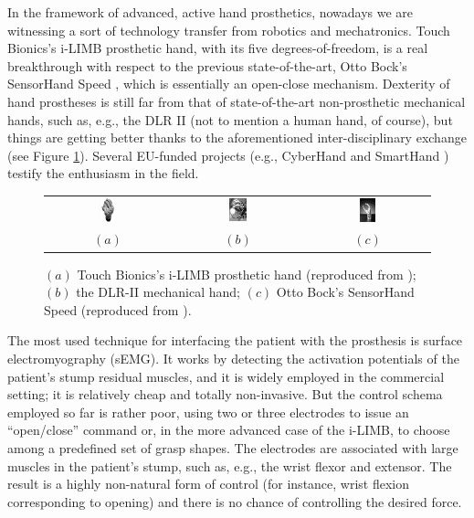 In the framework of advanced, active hand prosthetics, nowadays we are
witnessing a sort of technology transfer from robotics and
mechatronics. Touch Bionics's i-LIMB \cite{ilimb} prosthetic hand,
with its five degrees-of-freedom, is a real breakthrough with respect
to the previous state-of-the-art, Otto Bock's SensorHand Speed
\cite{sensorhand}, which is essentially an open-close
mechanism. Dexterity of hand prostheses is still far from that of
state-of-the-art non-prosthetic mechanical hands, such as, e.g., the
DLR II \cite{Hua2006} (not to mention a human hand, of course), but
things are getting better thanks to the aforementioned
inter-disciplinary exchange (see Figure \ref{fig:hands}). Several
EU-funded projects (e.g., CyberHand \cite{CyberHand} and SmartHand
\cite{smarthand}) testify the enthusiasm in the field.

\begin{figure}
  \begin{tabular}{ccc}
    \includegraphics[width=0.14\textwidth]{figs/hands_TB.jpg} &
    \includegraphics[width=0.14\textwidth]{figs/hands_DLRII.jpg} &
    \includegraphics[width=0.14\textwidth]{figs/hands_OB.jpg} \\
    $(a)$ & $(b)$ & $(c)$
  \end{tabular}
  \caption{$(a)$ Touch Bionics's i-LIMB prosthetic hand (reproduced
    from \cite{ilimb}); $(b)$ the DLR-II mechanical hand; $(c)$ Otto
    Bock's SensorHand Speed (reproduced from \cite{sensorhand}).}
  \label{fig:hands}
\end{figure}

The most used technique for interfacing the patient with the
prosthesis is surface electromyography (sEMG). It works by detecting
the activation potentials of the patient's stump residual muscles, and
it is widely employed in the commercial setting; it is relatively
cheap and totally non-invasive. But the control schema employed so far
is rather poor, using two or three electrodes to issue an
``open/close'' command or, in the more advanced case of the i-LIMB, to
choose among a predefined set of grasp shapes. The electrodes are
associated with large muscles in the patient's stump, such as, e.g.,
the wrist flexor and extensor. The result is a highly non-natural form
of control (for instance, wrist flexion corresponding to opening) and
there is no chance of controlling the desired force.

